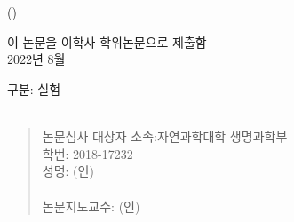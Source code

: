 
\begin{titlepage}
  \begin{spacing}{1.6}
    \makeatletter
    \begin{center}
      { \\}
      \vfill
      {\LARGE \@title\\}
      {\Large (\@titlealt)\\}

      \vfill

      {\Large
        이 논문을 이학사 학위논문으로 제출함 \\
        2022년 8월 \\
      }


      \vfill

      {\Large
        구분: 실험 \\
        \hfill\\
      }
    \end{center}
    \begin{quote}
      {\large
        논문심사 대상자 소속:\hfill 자연과학대학 생명과학부 \hfill \phantom{(인)}\\
        \phantom{논문심사 대상자} 학번: \hfill 2018-17232 \hfill \phantom{(인)}\\
        \phantom{논문심사 대상자} 성명: \hfill \@author \hfill (인)\\
        \\
        논문지도교수: \hfill \@advisor \hfill (인)
      }
    \end{quote}

    \vspace*{2cm}
    \makeatother
  \end{spacing}
\end{titlepage}
